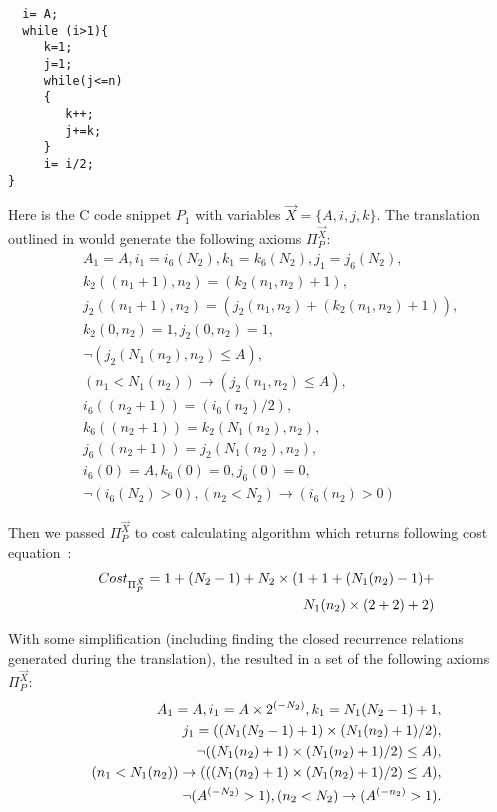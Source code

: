 \documentclass[12pt]{extarticle}
\theoremstyle{definition}
\begin{document}
\begin{verbatim}
  i= A;
  while (i>1){
     k=1;
     j=1;
     while(j<=n)
     {
        k++;
        j+=k;
     }
     i= i/2;
}
\end{verbatim}

Here is the C code snippet $P_1$ with variables $\vec{X}=\{A,i,j,k\}$.  The translation outlined in \cite{Lin20161} would generate the following axioms $\Pi_{P}^{\vec{X}}$:
\begin{eqnarray*}
	&& A_1 = A, i_1 = i_6(N_2), k_1 = k_6(N_2), j_1 = j_6(N_2),\\ 
	&& k_2((n_1+1),n_2) = (k_2(n_1,n_2)+1),\\
	&& j_2((n_1+1),n_2) = (j_2(n_1,n_2)+(k_2(n_1,n_2)+1)),\\
	&& k_2(0,n_2) = 1, j_2(0,n_2) = 1,\\
    && \neg (j_2(N_1(n_2),n_2)\leq A),\\
    &&(n_1<N_1(n_2)) \rightarrow (j_2(n_1,n_2)\leq A),\\
	&& i_6((n_2+1)) = (i_6(n_2)/2),\\
	&& k_6((n_2+1)) = k_2(N_1(n_2),n_2),\\
	&& j_6((n_2+1)) = j_2(N_1(n_2),n_2),\\
	&& i_6(0) = A, k_6(0) = 0, j_6(0) = 0,\\
	&& \neg (i_6(N_2)>0), (n_2<N_2) \rightarrow (i_6(n_2)>0)
\end{eqnarray*}


Then we passed $\Pi_{P}^{\vec{X}}$ to cost calculating algorithm which returns following cost equation :
\begin{eqnarray*}
	&&Cost_{\Pi_{P}^{\vec{X}}}= 1+(N_2-1)+N_2\times(1+1+(N_1(n_2)-1)+\\
	&&\hspace*{5em}N_1(n_2)\times(2+2)+2)
\end{eqnarray*}


With some simplification (including finding the closed recurrence relations generated during the translation), the resulted in a set of the following axioms $\Pi_{P}^{\vec{X}}$:
\begin{eqnarray*}
	&& A_1 = A, i_1 = A\times 2^{(-N_2)}, k_1 = N_1(N_2-1)+1,\\ 
	&& j_1 = ((N_1(N_2-1)+1)\times(N_1(n_2)+1)/2),\\
	&&\neg ((N_1(n_2)+1)\times(N_1(n_2)+1)/2) \leq A),\\  
	&&(n_1<N_1(n_2)) \rightarrow (((N_1(n_2)+1)\times(N_1(n_2)+1)/2)\leq A),\\    
	&&\neg (A \time 2^{(-N_2)}>1),(n_2<N_2) \rightarrow (A \time2^{(-n_2)}>1).
\end{eqnarray*}
\end{document}
